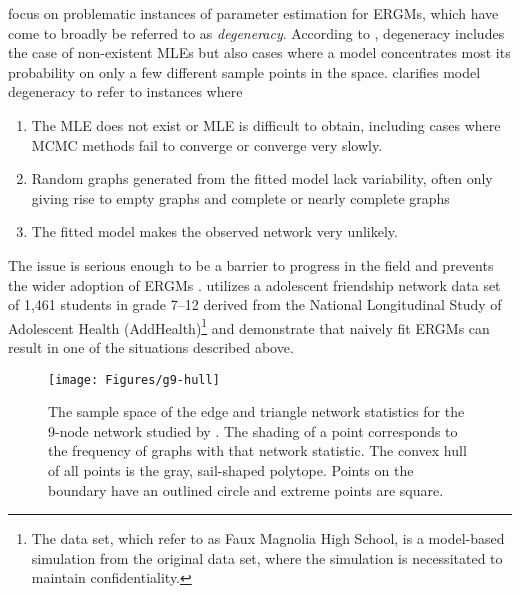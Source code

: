 \citet*{Handcock:degeneracy, Rinaldo:2009} focus on problematic instances of parameter 
estimation for ERGMs, which have come to broadly be referred 
to as \emph{degeneracy}.  
According to \citet{Handcock:degeneracy}, degeneracy includes the 
case of non-existent MLEs but also 
cases where a model concentrates most its probability on only a few different sample 
points in the space.  \citet{Rinaldo:2009} clarifies model degeneracy to refer 
to instances where
\begin{enumerate}
\item The MLE does not exist or   
 MLE is difficult to obtain, including cases where MCMC methods fail to converge
or converge very slowly.
\item Random graphs generated from the fitted model lack variability, often only 
giving rise to empty graphs and complete or nearly complete graphs
\item The fitted model makes the observed network very unlikely.
\end{enumerate}

%
The issue is serious enough to be a barrier to progress in the field and 
prevents the wider adoption of ERGMs \citep{advancesp*}.  
\citet{statnet-tutorial} utilizes a adolescent friendship network data set 
of 1,461 students in grade 7--12 derived from the National Longitudinal Study of 
Adolescent Health (AddHealth)\footnote{The data set, which \citeauthor{statnet-tutorial} refer to as Faux 
Magnolia High School, is a model-based simulation from the original data set, where 
the simulation is necessitated to maintain confidentiality.
} and demonstrate that naively fit ERGMs can result in one of the
situations described above.

\begin{figure}[h]
\centering
\texttt{[image: Figures/g9-hull]}
\caption{The sample space of the edge and triangle network statistics for the 9-node 
network studied by \citet{Rinaldo:2009}.  
The shading of a point corresponds to the frequency of 
graphs with that network statistic.  
The convex hull of all points is the gray, sail-shaped polytope.  Points on the 
boundary have an 
outlined circle and extreme points are square.}
\label{F:g9-hull}
\end{figure}

